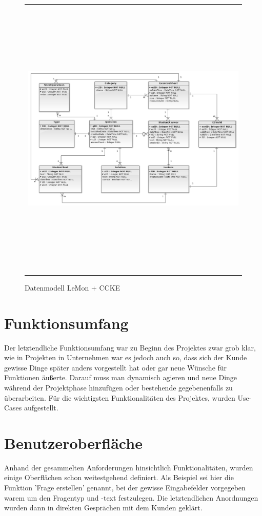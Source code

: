 \begin{landscape}
\begin{figure} [!htb]
	\begin{center}
		  \begin{tabular}{@{}r@{}}
			{\includegraphics[height=37em]{images/Entityrelationshipdiagram.png}}\\
 	 	 \end{tabular}
		\caption{Datenmodell LeMon + CCKE}
		\label{fig:Datenmodell}
	\end{center} 
\end{figure}

\end{landscape}

\section{Funktionsumfang}
Der letztendliche Funktionsumfang war zu Beginn des Projektes zwar grob klar, wie in Projekten in Unternehmen war es jedoch auch so, dass sich der Kunde gewisse Dinge später anders vorgestellt hat oder gar neue Wünsche für Funktionen äußerte.
Darauf muss man dynamisch agieren und neue Dinge während der Projektphase hinzufügen oder bestehende gegebenenfalls zu überarbeiten.
Für die wichtigsten Funktionalitäten des Projektes, wurden Use-Cases aufgestellt.

\section{Benutzeroberfläche}
Anhand der gesammelten Anforderungen hinsichtlich Funktionalitäten, wurden einige Oberflächen schon weitestgehend definiert. 
Als Beispiel sei hier die Funktion 'Frage erstellen' genannt, bei der gewisse Eingabefelder vorgegeben warem um den Fragentyp und -text festzulegen.
Die letztendlichen Anordnungen wurden dann in direkten Gesprächen mit dem Kunden geklärt.
